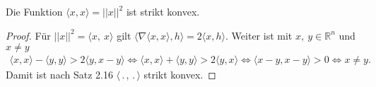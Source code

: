 \begin{satz}
\label{satz-strict-konvex-innprdt}
	Die Funktion $\langle x, x \rangle = ||x||^2$ ist strikt konvex.
\end{satz}
\begin{proof}
	Für $||x||^2 = \langle x ,\ x \rangle$ gilt $\langle \nabla \langle x,x \rangle, h \rangle = 2 \langle x, h \rangle$. Weiter ist mit $x ,\ y \in \mathbb{R}^n$ und $x \neq y$
	$$
	\begin{aligned}
	\langle x, x \rangle - \langle y, y \rangle > 2 \langle y , x - y \rangle \Leftrightarrow
	\langle x, x \rangle + \langle y, y \rangle > 2 \langle y , x \rangle 
	\Leftrightarrow
	\langle x-y, x-y \rangle > 0 \Leftrightarrow  x \neq y.
	\end{aligned}
	$$
	Damit ist nach Satz 2.16 \cite{gk-tnro} $\langle \, . \, , \, . \, \rangle$ strikt konvex.
\end{proof}